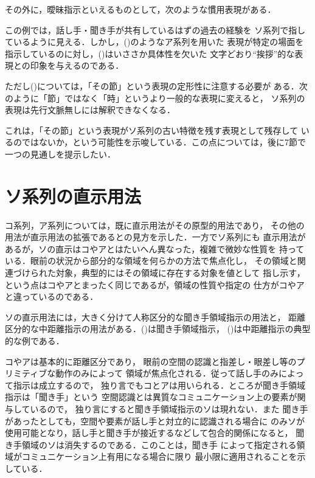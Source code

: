 その外に，曖昧指示といえるものとして，次のような慣用表現がある．


この例では，話し手・聞き手が共有しているはずの過去の経験を
ソ系列で指しているように見える．しかし，()のようなア系列を用いた
表現が特定の場面を指示しているのに対し，()はいささか具体性を欠いた
文字どおり``挨拶''的な表現との印象を与えるのである．


ただし()については，「その節」という表現の定形性に注意する必要が
ある．次のように「節」ではなく「時」というより一般的な表現に変えると，
ソ系列の表現は先行文脈無しには解釈できなくなる．


これは，「その節」という表現がソ系列の古い特徴を残す表現として残存して
いるのではないか，という可能性を示唆している．この点については，後に7節で
一つの見通しを提示したい．

\section{ソ系列の直示用法}
コ系列，ア系列については，既に直示用法がその原型的用法であり，
その他の用法が直示用法の拡張であるとの見方を示した．一方でソ系列にも
直示用法があるが，ソの直示はコやアとはたいへん異なった，複雑で微妙な性質を
持っている．眼前の状況から部分的な領域を何らかの方法で焦点化し，
その領域と関連づけられた対象，典型的にはその領域に存在する対象を値として
指し示す，という点はコやアとまったく同じであるが，領域の性質や指定の
仕方がコやアと違っているのである．

ソの直示用法には，大きく分けて人称区分的な聞き手領域指示の用法と，
距離区分的な中距離指示の用法がある．()は聞き手領域指示，
()は中距離指示の典型的な例である．



コやアは基本的に距離区分であり，
眼前の空間の認識と指差し・眼差し等のプリミティブな動作のみによって
領域が焦点化される．従って話し手のみによって指示は成立するので，
独り言でもコとアは用いられる．ところが聞き手領域指示は「聞き手」という
空間認識とは異質なコミュニケーション上の要素が関与しているので，
独り言にすると聞き手領域指示のソは現れない\cite{kuroda}．また
聞き手があったとしても，空間や要素が話し手と対立的に認識される場合に
のみソが使用可能となり，話し手と聞き手が接近するなどして包合的関係になると，
聞き手領域のソは消失するのである\cite{mikami55}．このことは，聞き手
によって指定される領域がコミュニケーション上有用になる場合に限り
最小限に適用されることを示している．

